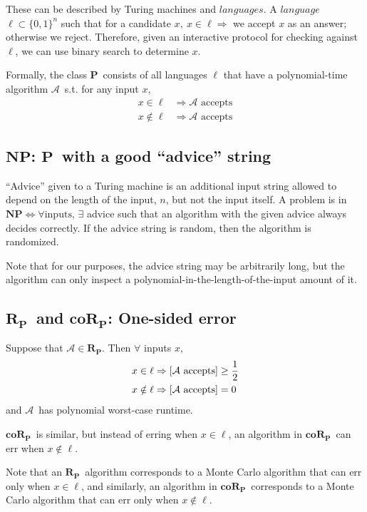 \documentclass[11pt]{article}
\let\Pr\relax
\DeclareMathOperator*{\Pr}{\mathbb{P}}
\newcommand{\Pt}{\ensuremath{\mathbf{P}}}
\newcommand{\NP}{\ensuremath{\mathbf{NP}}}
\newcommand{\RP}{\ensuremath{\mathbf{R_{P}}}}
\newcommand{\coRP}{\ensuremath{\mathbf{coR_{P}}}}
\newcommand{\Alg}{\ensuremath{\mathcal{A}}}
\begin{document}
These can be described by Turing machines and $languages$. A $language$ $\ell \subset \{0,1\}^n$ such that for a candidate $x,\ x \in \ell \Rightarrow$ we accept $x$ as an answer; otherwise we reject.
Therefore, given an interactive protocol for checking against $\ell$, we can use binary search to determine $x$.

Formally, the class \Pt\ consists of all languages $\ell$ that have a polynomial-time algorithm \Alg\ s.t. for any input $x$,
\begin{align*}
  x \in \ell &\Rightarrow \Alg \text{ accepts} \\
  x \notin \ell &\Rightarrow \Alg \text{ accepts}
\end{align*}

\subsection{\NP: \Pt\ with a good ``advice'' string}

``Advice'' given to a Turing machine is an additional input string allowed to depend on the length of the input, $n$, but not the input itself. A problem is in $\NP \Leftrightarrow \forall\text{inputs, }\exists$ advice such that an algorithm with the given advice always decides correctly. If the advice string is random, then the algorithm is randomized.

Note that for our purposes, the advice string may be arbitrarily long, but the algorithm can only inspect a polynomial-in-the-length-of-the-input amount of it.

\subsection{\RP\ and \coRP: One-sided error }

Suppose that $\Alg\in\RP$. Then $\forall$ inputs $x$,
\begin{align*}
  x \in \ell &\Rightarrow \Pr[\Alg \text{ accepts}] \geq \frac{1}{2} \\
  x \notin \ell &\Rightarrow \Pr[\Alg \text{ accepts}] = 0
\end{align*}
and \Alg\ has polynomial worst-case runtime.

\coRP\ is similar, but instead of erring when $x\in\ell$, an algorithm in \coRP\ can err when $x\notin\ell$.

Note that an \RP\ algorithm corresponds to a Monte Carlo algorithm that can err only when $x \in \ell$, and similarly, an algorithm in \coRP\ corresponds to a Monte Carlo algorithm that can err only when $x \notin \ell$.
\end{document}

